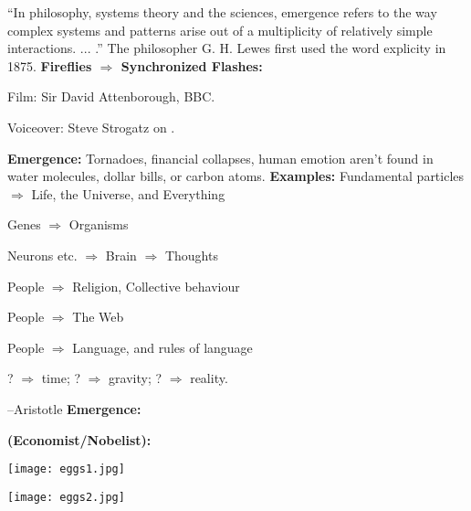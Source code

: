     ``In philosophy, systems theory and the sciences, emergence refers to
    the way complex systems and patterns arise out of a multiplicity of
    relatively simple interactions. 
    {... .''}
    The philosopher G. H. Lewes first
    used the word explicity in 1875.
  \textbf{Fireflies $\Rightarrow$ Synchronized Flashes:}


  \small

  Film: Sir David Attenborough, BBC.

  Voiceover: Steve Strogatz on 
  .

  \textbf{Emergence:}
    Tornadoes, financial collapses, human emotion aren't
    found in water molecules, dollar bills, or carbon atoms.
  \textbf{Examples:}
      Fundamental particles $\Rightarrow$ Life, the Universe, and Everything
     
      Genes $\Rightarrow$ Organisms
    
      Neurons etc. $\Rightarrow$ Brain $\Rightarrow$ Thoughts
     
      People $\Rightarrow$ Religion, Collective behaviour
    
      People $\Rightarrow$ The Web
    
      People $\Rightarrow$ Language, and rules of language
    
      ? $\Rightarrow$ time; 
      ? $\Rightarrow$ gravity;
      ? $\Rightarrow$ reality.
  
    --Aristotle
  \textbf{Emergence:}

  \textbf{
      \smallskip
      (Economist/Nobelist):}
    \medskip
      
\begin{marginfigure}[]
\texttt{[image: eggs1.jpg]}\\
\end{marginfigure}

      
\begin{marginfigure}[]
\texttt{[image: eggs2.jpg]}\\
\end{marginfigure}

